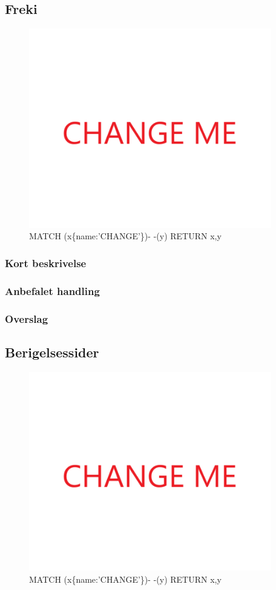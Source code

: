 \documentclass{article}
\begin{document}
\subsection{Freki}
\begin{figure}[h]
\includegraphics[width=300pt]{CHANGE.PNG}
\caption{MATCH (x\{name:'CHANGE'\})- -(y) RETURN x,y}
\end{figure}
\subsubsection{Kort beskrivelse}
\subsubsection{Anbefalet handling}
\subsubsection{Overslag}
\subsection{Berigelsessider}
\begin{figure}[h]
\includegraphics[width=300pt]{CHANGE.PNG}
\caption{MATCH (x\{name:'CHANGE'\})- -(y) RETURN x,y}
\end{figure}
\end{document}
